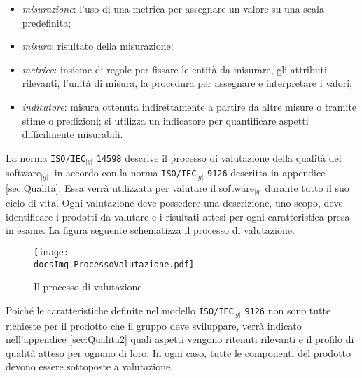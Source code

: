 {{\begin{itemize}
		\item \textit{misurazione}: l’uso di una metrica per assegnare un valore su una scala predefinita;
		\item \textit{misura}: risultato della misurazione;
		\item \textit{metrica}: insieme di regole per fissare le entità da misurare, gli attributi rilevanti, l’unità di misura, 
		      la procedura per assegnare e interpretare i valori;
		\item \textit{indicatore}: misura ottenuta indirettamente a partire da altre misure o tramite stime o predizioni; 
		      si utilizza un indicatore per quantificare aspetti difficilmente misurabili.
	\end{itemize}
	La norma \texttt{ISO/IEC}$_{|g|}$ \texttt{14598} descrive il processo di valutazione della qualità del software$_{|g|}$, 
	in accordo con la norma \texttt{ISO/IEC}$_{|g|}$ \texttt{9126} descritta in appendice \ref{sec:Qualita}. Essa verrà utilizzata per 
	valutare il software$_{|g|}$ durante tutto il suo ciclo di vita. Ogni valutazione deve possedere una descrizione, uno scopo, deve 
	identificare i prodotti da valutare e i risultati attesi per ogni caratteristica presa in esame. La figura seguente 
	schematizza il processo di valutazione.
 
	\begin{figure}[h!]
	  \centering
	  \texttt{[image: \\docsImg ProcessoValutazione.pdf]}
	  \caption{Il processo di valutazione}
	\end{figure}

	Poiché le caratteristiche definite nel modello \texttt{ISO/IEC}$_{|g|}$ \texttt{9126} non sono tutte richieste per il prodotto 
	che il gruppo deve sviluppare, verrà indicato nell'appendice \ref{sec:Qualita2} quali aspetti vengono ritenuti rilevanti e il profilo di qualità atteso per ognuno di loro. 
	In ogni caso, tutte le componenti del prodotto devono essere sottoposte a valutazione.
    }
}
